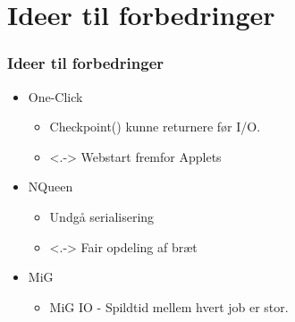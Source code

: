 \documentclass{beamer}
\begin{document}
	

\section{Ideer til forbedringer}
\frame
{
  \frametitle{Ideer til forbedringer}

  \begin{itemize}
		\item<+-> One-Click
		\begin{itemize}
			\item<1-> Checkpoint() kunne returnere før I/O.
			\item<.-> Webstart fremfor Applets
		\end{itemize}
		\item<+-> NQueen 
		\begin{itemize}
			\item<1-> Undgå serialisering
			\item<.-> Fair opdeling af bræt
		\end{itemize}
		\item<+-> MiG
		\begin{itemize}
			\item<1-> MiG IO - Spildtid mellem hvert job er stor.
		\end{itemize}
  \end{itemize}
}
\end{document}
